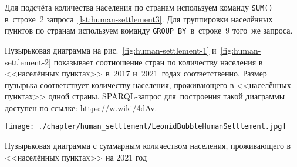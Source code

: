 Для подсчёта количества населения по странам 
используем команду \lstinline|SUM()| в~строке~2 запроса~\ref{lst:human-settlement3}. 
Для группировки населённых пунктов по странам 
используем команду \lstinline|GROUP BY|\, в~строке~9 того~же запроса.

Пузырьковая диаграмма на рис.~\ref{fig:human-settlement-1} и~\ref{fig:human-settlement-2} 
показывает соотношение стран по количеству населения в <<населённых пунктах>> 
в~2017 и~2021~годах соответственно. 
Размер пузырька соответствует количеству населения, проживающего в <<населённых пунктах>> одной страны. 
SPARQL-запрос для~построения такой диаграммы доступен по ссылке: \href{https://w.wiki/4dAv}{https://w.wiki/4dAv}.

\begin{marginfigure}[0.0cm]
	\texttt{[image: ./chapter/human\_settlement/LeonidBubbleHumanSettlement.jpg]}
    \caption[Сколько населения проживает в населённых пунктах, 2021.]{Пузырьковая диаграмма с суммарным количеством населения, проживающего в <<населённых пунктах>> на 2021 год} 
	\label{fig:human-settlement-2}
\end{marginfigure}




